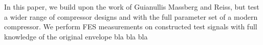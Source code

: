 \documentclass[../main2.tex]{subfiles}
\begin{document}
In this paper, we build upon the work of Guianullis Massberg and Reiss, but test a wider range of compressor designs and with the full parameter set of a modern compressor. We perform FES measurements on constructed test signals with full knowledge of the original envelope bla bla bla


\end{document}

